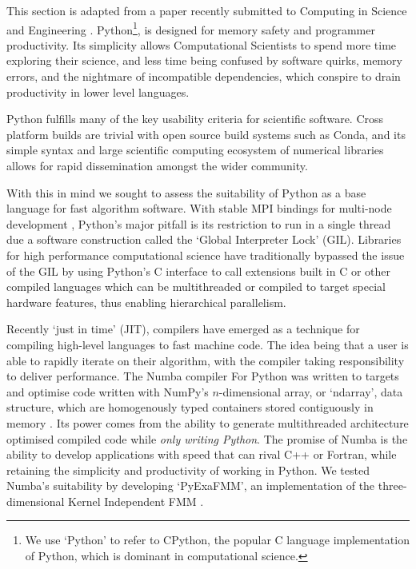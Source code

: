 This section is adapted from a paper recently submitted to Computing in Science and Engineering \cite{kailasa2022pyexafmm}. Python\footnote{We use `Python' to refer to CPython, the popular C language implementation of Python, which is dominant in computational science.}, is designed for memory safety and programmer productivity. Its simplicity allows Computational Scientists to spend more time exploring their science, and less time being confused by software quirks, memory errors, and the nightmare of incompatible dependencies, which conspire to drain productivity in lower level languages.

Python fulfills many of the key usability criteria for scientific software. Cross platform builds are trivial with open source build systems such as Conda, and its simple syntax and large scientific computing ecosystem of numerical libraries allows for rapid dissemination amongst the wider community.

With this in mind we sought to assess the suitability of Python as a base language for fast algorithm software. With stable MPI bindings for multi-node development \cite{dalcin2021mpi4py}, Python's major pitfall is its restriction to run in a single thread due a software construction called the `Global Interpreter Lock' (GIL). Libraries for high performance computational science have traditionally bypassed the issue of the GIL by using Python's C interface to call extensions built in C or other compiled languages which can be multithreaded or compiled to target special hardware features, thus enabling hierarchical parallelism.

Recently `just in time' (JIT), compilers have emerged as a technique for compiling high-level languages to fast machine code. The idea being that a user is able to rapidly iterate on their algorithm, with the compiler taking responsibility to deliver performance. The Numba compiler For Python was written to targets and optimise code written with NumPy's $n$-dimensional array, or `ndarray', data structure, which are homogenously typed containers stored contiguously in memory \cite{lam2015numba}. Its power comes from the ability to generate multithreaded architecture optimised compiled code while \textit{only writing Python}. The promise of Numba is the ability to develop applications with speed that can rival C++ or Fortran, while retaining the simplicity and productivity of working in Python. We tested Numba's suitability by developing `PyExaFMM', an implementation of the three-dimensional Kernel Independent FMM \cite{kailasa2022pyexafmm}.


